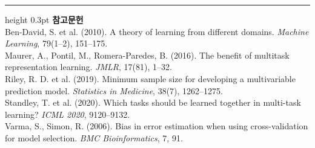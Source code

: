 \documentclass[10pt]{article}
\begin{document}
\vspace{0.6em}
\hrule height 0.3pt
\vspace{0.5em}
{\footnotesize
\textbf{참고문헌}\\[0.3em]
Ben-David, S. et al. (2010). A theory of learning from different domains.
\emph{Machine Learning}, 79(1--2), 151--175.\\[0.15em]
Maurer, A., Pontil, M., Romera-Paredes, B. (2016). The benefit of multitask
representation learning. \emph{JMLR}, 17(81), 1--32.\\[0.15em]
Riley, R. D. et al. (2019). Minimum sample size for developing a multivariable
prediction model. \emph{Statistics in Medicine}, 38(7), 1262--1275.\\[0.15em]
Standley, T. et al. (2020). Which tasks should be learned together in multi-task
learning? \emph{ICML 2020}, 9120--9132.\\[0.15em]
Varma, S., Simon, R. (2006). Bias in error estimation when using cross-validation
for model selection. \emph{BMC Bioinformatics}, 7, 91.
}
\end{document}
